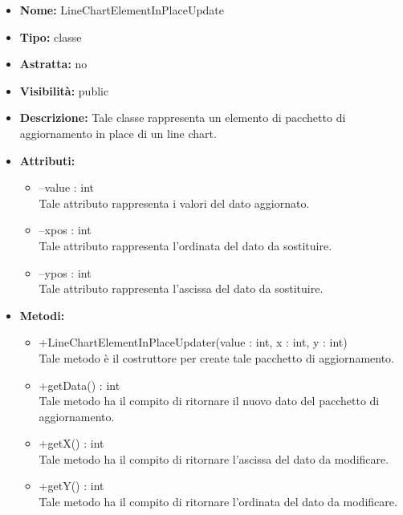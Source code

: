 			
			\begin{itemize}
			\item \textbf{Nome:} LineChartElementInPlaceUpdate
			\item \textbf{Tipo:} classe
			
		\item \textbf{Astratta:}
		no
			\item \textbf{Visibilità:} public
			\item \textbf{Descrizione:} Tale classe rappresenta un elemento di pacchetto di aggiornamento in place di un line chart.
			\item \textbf{Attributi:}
				\begin{itemize}
				\setlength{\itemsep}{5pt}
				
					\item[\ding{111}] {--value : int} \\ [1mm] Tale attributo rappresenta i valori del dato aggiornato.
					\item[\ding{111}] {--xpos : int} \\ [1mm] Tale attributo rappresenta l'ordinata del dato da sostituire.
					\item[\ding{111}] {--ypos : int} \\ [1mm] Tale attributo rappresenta l'ascissa del dato da sostituire.
				\end{itemize}
		
			\item \textbf{Metodi:}
				\begin{itemize}
				\setlength{\itemsep}{5pt}
				
					\item[\ding{111}] {{+LineChartElementInPlaceUpdater(value : int, x : int, y : int)}} \\ [1mm] Tale metodo è il costruttore per create tale pacchetto di aggiornamento.
					\item[\ding{111}] {{+getData() : int}} \\ [1mm] Tale metodo ha il compito di ritornare il nuovo dato del pacchetto di aggiornamento.
					\item[\ding{111}] {{+getX() : int}} \\ [1mm] Tale metodo ha il compito di ritornare l'ascissa del dato da modificare.
					\item[\ding{111}] {{+getY() : int}} \\ [1mm] Tale metodo ha il compito di ritornare l'ordinata del dato da modificare.
				\end{itemize}
		
			\end{itemize}
	

